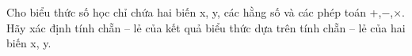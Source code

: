 Cho biểu thức số học chỉ chứa hai biến x, y, các hằng số và các phép toán +,−,×. Hãy xác định tính chẵn – lẻ của kết quả biểu thức dựa trên tính chẵn – lẻ của hai biến x, y.